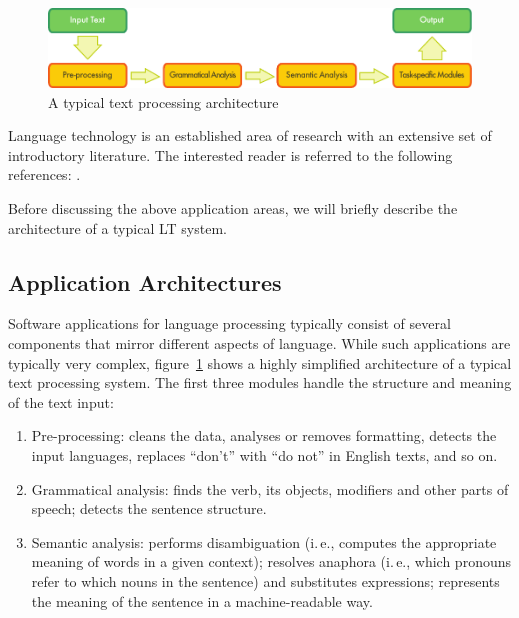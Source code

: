 \documentclass[]{../../metanetpaper}
\begin{document}
\begin{multicols}{2}
\begin{figure}[b]
  \center
  \includegraphics[width=\textwidth]{../_media/english/text_processing_app_architecture}
  \caption{A typical text processing architecture}
  \label{fig:textprocessingarch_en}
\end{figure}

Language technology is an established area of research with an extensive set of introductory literature. The interested reader is referred to the following references:  \cite{jurafsky-martin01, manning-schuetze1, lt-world1, lt-survey1}.

Before discussing the above application areas, we will briefly describe the architecture of a typical LT system.

\subsection{Application Architectures}

Software applications for language processing typically consist of several components that mirror different aspects of language. While such applications are typically very complex, figure~\ref{fig:textprocessingarch_en} shows a highly simplified architecture of a typical text processing system. The first three modules handle the structure and meaning of the text input:

\begin{enumerate}
\item Pre-processing: cleans the data, analyses or removes formatting, detects the input languages, replaces ``don't'' with ``do not'' in English texts, and so on.
\item Grammatical analysis: finds the verb, its objects, modifiers and other parts of speech; detects the sentence structure.
\item Semantic analysis: performs disambiguation (i.\,e., computes the appropriate meaning of words in a given context); resolves anaphora (i.\,e., which pronouns refer to which nouns in the sentence) and substitutes expressions; represents the meaning of the sentence in a machine-readable way.
\end{enumerate}


\end{multicols}
\end{document}
